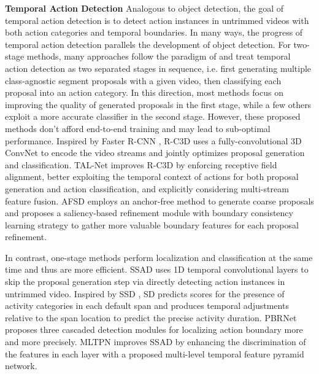 \documentclass[final]{cvpr}
\begin{document}
\textbf{Temporal Action Detection}
Analogous to object detection, the goal of temporal action detection is to detect action instances in untrimmed videos with both action categories and temporal boundaries. In many ways, the progress of temporal action detection parallels the development of object detection. 
For two-stage methods, many approaches \cite{gao2018ctap, lin2018bsn, lin2019bmn, zeng2019graph, liu2019multi, zhao2020bottom, gao2020accurate, bai2020boundary, su2020bsn++, qing2021temporal, shou2017cdc, zhao2017temporal} follow the paradigm of \cite{girshick2014rich, girshick2015fast} and treat temporal action detection as two separated stages in sequence, i.e. first generating multiple class-agnostic segment proposals with a given video, then classifying each proposal into an action category. In this direction, most methods \cite{gao2018ctap, lin2018bsn, lin2019bmn, zeng2019graph, liu2019multi, lin2020fast, zhao2020bottom, gao2020accurate, bai2020boundary, su2020bsn++, qing2021temporal} focus on improving the quality of generated proposals in the first stage, while a few others \cite{shou2017cdc, zhao2017temporal} exploit a more accurate classifier in the second stage. However, these proposed methods don't afford end-to-end training and may lead to sub-optimal performance. Inspired by Faster R-CNN \cite{ren2016faster}, R-C3D \cite{xu2017r} uses a fully-convolutional 3D ConvNet to encode the video streams and jointly optimizes proposal generation and classification. TAL-Net \cite{chao2018rethinking} improves R-C3D \cite{xu2017r} by enforcing receptive field alignment, better exploiting the temporal context of actions for both proposal generation and action classification, and explicitly considering multi-stream feature fusion. AFSD \cite{lin2021learning} employs an anchor-free method to generate coarse proposals and proposes a saliency-based refinement module with boundary consistency learning strategy to gather more valuable boundary features for each proposal refinement. 

In contrast, one-stage methods \cite{lin2017single, zhang2018s3d, liu2020progressive, wang2020multi} perform localization and classification at the same time and thus are more efficient. SSAD \cite{lin2017single} uses 1D temporal convolutional layers to skip the proposal generation step via directly detecting action instances in untrimmed video. Inspired by SSD \cite{liu2016ssd}, SD \cite{zhang2018s3d} predicts scores for the presence of activity categories in each default span and produces temporal adjustments relative to the span location to predict the precise activity duration. PBRNet \cite{liu2020progressive} proposes three cascaded detection modules for localizing action boundary more and more precisely. MLTPN \cite{wang2020multi} improves SSAD \cite{lin2017single} by enhancing the discrimination of the features in each layer with a proposed multi-level temporal feature pyramid network. 
\end{document}
